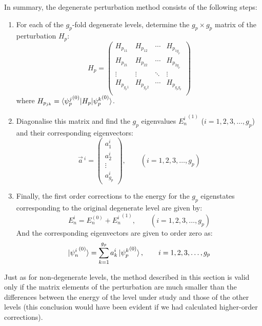 In summary, the degenerate perturbation method consists of the following steps:
\begin{enumerate}
    \item For each of the $g_p$-fold degenerate levels, determine the $g_p\times g_p$ matrix of the perturbation $H_p$:
    \begin{equation}
        H_p = \begin{pmatrix}
        H_{p_{11}} & H_{p_{12}} & \cdots & H_{p_{1g_p}} \\
        H_{p_{21}} & H_{p_{22}} & \cdots & H_{p_{2g_p}} \\
        \vdots & \vdots & \ddots & \vdots \\
        H_{p_{g_p1}} & H_{p_{g_p2}} & \cdots & H_{p_{g_pg_p}} \\
        \end{pmatrix}
    \end{equation}
    where $H_{p_{jk}} = \braket{{\psi_p^j}^{(0)}|H_p|{\psi_p^k}^{(0)}}$.
    \item Diagonalise this matrix and find the $g_p$ eigenvalues ${E_n^i}^{(1)}$ ($i = 1, 2, 3, \dots, g_p$) and their corresponding eigenvectors:
    \begin{equation}
        \vec{a}\,^i = \begin{pmatrix}
            a_1^i \\ a_2^i \\ \vdots \\ a_{g_p}^i 
        \end{pmatrix},\qquad (i = 1, 2, 3, \dots, g_p)
    \end{equation} 
    \item Finally, the first order corrections to the energy for the $g_p$ eigenstates corresponding to the original degenerate level are given by:
    \begin{equation}
        E_n^i = E_n^{(0)} + {E_n^i}^{(1)},\qquad (i = 1, 2, 3, \dots, g_p)
    \end{equation}
    And the corresponding eigenvectors are given to order zero as:
    \begin{equation}
        \ket{{\psi_n^i}^{(0)}} = \sum_{k=1}^{g_p} a_k^i\ket{{\psi_p^k}^{(0)}}, \qquad i = 1, 2, 3, \dots, g_p
    \end{equation}
\end{enumerate}

Just as for non-degenerate levels, the method described in this section is valid only if the matrix elements of the perturbation are much smaller than the differences between the energy of the level under study and those of the other levels (this conclusion would have been evident if we had calculated higher-order corrections).

